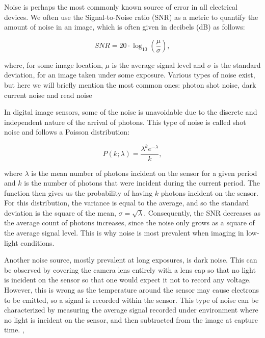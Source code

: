 Noise is perhaps the most commonly known source of error in all electrical devices. We often use the Signal-to-Noise ratio (SNR) as a metric to quantify the amount of noise in an image, which is often given in decibels (dB) as follows:

\begin{equation}
\label{eq:snr}
SNR = 20\cdot \log_{10}(\frac{\mu}{\sigma}),
\end{equation} 

where, for some image location, $\mu$ is the average signal level and $\sigma$ is the standard deviation, for an image taken under some exposure. Various types of noise exist, but here we will briefly mention the most common ones: photon shot noise, dark current noise and read noise \cite[62, chapter. 3]{rowlands2020physics}

In digital image sensors, some of the noise is unavoidable due to the discrete and independent nature of the arrival of photons. This type of noise is called shot noise and follows a Poisson distribution:

\begin{equation}
\label{eq:poisson}
P(k; \lambda) = \frac{\lambda^k e^{-\lambda}}{k},
\end{equation}

where $\lambda$ is the mean number of photons incident on the sensor for a given period and $k$ is the number of photons that were incident during the current period. The function then gives us the probability of having $k$ photons incident on the sensor. For this distribution, the variance is equal to the average, and so the standard deviation is the square of the mean, $\sigma = \sqrt{\lambda}$. Consequently, the SNR decreases as the average count of photons increases, since the noise only grows as a square of the average signal level. This is why noise is most prevalent when imaging in low-light conditions. \cite[62, chapter. 3]{rowlands2020physics}

Another noise source, mostly prevalent at long exposures, is dark noise. This can be observed by covering the camera lens entirely with a lens cap so that no light is incident on the sensor so that one would expect it not to record any voltage. However, this is wrong as the temperature around the sensor may cause electrons to be emitted, so a signal is recorded within the sensor. This type of noise can be characterized by measuring the average signal recorded under environment where no light is incident on the sensor, and then subtracted from the image at capture time. \cite[289]{nakamura}, \cite[63, chapter. 3]{rowlands2020physics}

